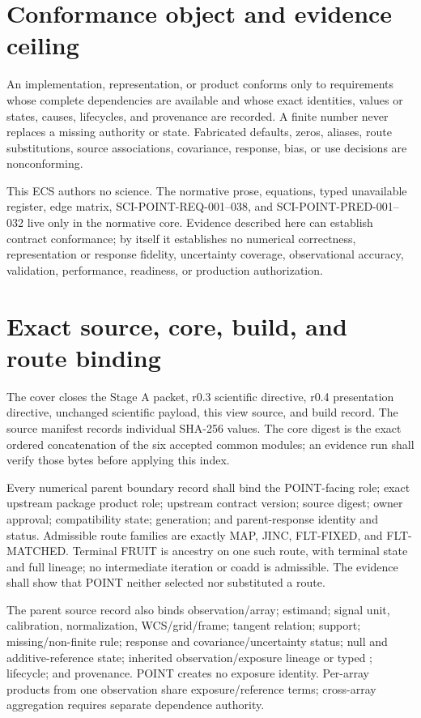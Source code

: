 \documentclass[11pt]{article}
\begin{document}
\section*{Conformance object and evidence ceiling}

An implementation, representation, or product conforms only to requirements
whose complete dependencies are available and whose exact identities, values
or states, causes, lifecycles, and provenance are recorded. A finite number
never replaces a missing authority or state. Fabricated defaults, zeros,
aliases, route substitutions, source associations, covariance, response, bias,
or use decisions are nonconforming.

This ECS authors no science. The normative prose, equations, typed unavailable
register, edge matrix, SCI-POINT-REQ-001--038, and SCI-POINT-PRED-001--032 live
only in the normative core. Evidence described here can establish contract
conformance; by itself it establishes no numerical correctness,
representation or response fidelity, uncertainty coverage, observational
accuracy, validation, performance, readiness, or production authorization.

\tableofcontents

\section{Exact source, core, build, and route binding}

The cover closes the Stage A packet, r0.3 scientific directive, r0.4
presentation directive, unchanged scientific payload, this view source, and
build record. The source manifest records individual SHA-256 values. The core
digest is the exact ordered concatenation of the six accepted common modules;
an evidence run shall verify those bytes before applying this index.

Every numerical parent boundary record shall bind the POINT-facing role; exact
upstream package product role; upstream contract version; source digest; owner
approval; compatibility state; generation; and parent-response identity and
status. Admissible route families are exactly MAP, JINC, FLT-FIXED, and
FLT-MATCHED. Terminal FRUIT is ancestry on one such route, with terminal state
and full lineage; no intermediate iteration or coadd is admissible. The
evidence shall show that POINT neither selected nor substituted a route.

The parent source record also binds observation/array; estimand; signal unit,
calibration, normalization, WCS/grid/frame; tangent relation; support;
missing/non-finite rule; response and covariance/uncertainty status; null and
additive-reference state; inherited observation/exposure lineage or typed
; lifecycle; and provenance. POINT creates no exposure
identity. Per-array products from one observation share exposure/reference
terms; cross-array aggregation requires separate dependence authority.
\end{document}

